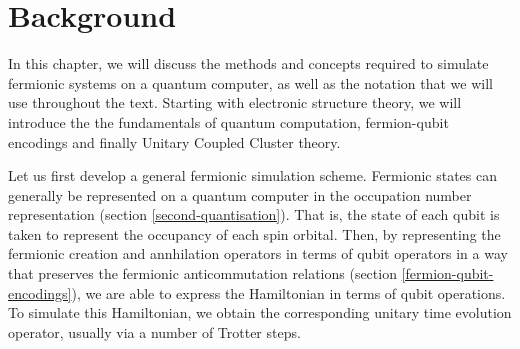\chapter{\label{background}Background}
In this chapter, we will discuss the methods and concepts required to simulate fermionic systems on a quantum computer, as well as the notation that we will use throughout the text. Starting with electronic structure theory, we will introduce the the fundamentals of quantum computation, fermion-qubit encodings and finally Unitary Coupled Cluster theory.

Let us first develop a general fermionic simulation scheme. Fermionic states can generally be represented on a quantum computer in the occupation number representation (section \ref{second-quantisation}). That is, the state of each qubit is taken to represent the occupancy of each spin orbital. Then, by representing the fermionic creation and annhilation operators in terms of qubit operators in a way that preserves the fermionic anticommutation relations (section \ref{fermion-qubit-encodings}), we are able to express the Hamiltonian in terms of qubit operations. To simulate this Hamiltonian, we obtain the corresponding unitary time evolution operator, usually via a number of Trotter steps.
